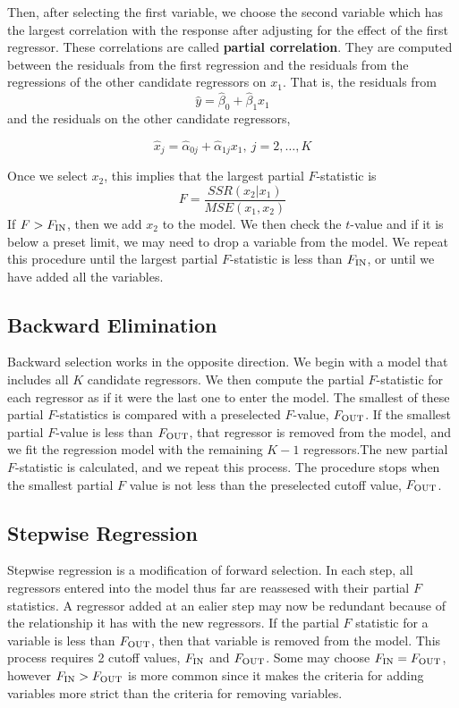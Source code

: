 Then, after selecting the first variable, we choose the second variable which has the largest correlation with the response after adjusting for the effect of the first regressor. These correlations are called \textbf{partial correlation}. They are computed between the residuals from the first regression and the residuals from the regressions of the other candidate regressors on $x_1$. That is, the residuals from 
\[\hat{y} = \hat{\beta}_0 + \hat{\beta}_1x_1 \]
and the residuals on the other candidate regressors, 

\[\hat{x}_j = \hat{\alpha}_{0j} + \hat{\alpha}_{1j}x_1, \ j = 2, \ldots, K\]

Once we select $x_2$, this implies that the largest partial $F$-statistic is 
\[F = \frac{SSR(x_2 | x_1)}{MSE(x_1,x_2)}\]
If $F > F_{\operatorname{IN}}$, then we add $x_2$ to the model. We then check the $t$-value and if it is below a preset limit, we may need to drop a variable from the model. We repeat this procedure until the largest partial $F$-statistic is less than $F_{\operatorname{IN}}$, or until we have added all the variables.

\subsection{Backward Elimination}

Backward selection works in the opposite direction. We begin with a model that includes all $K$ candidate regressors. We then compute the partial $F$-statistic for each regressor as if it were the last one to enter the model. The smallest of these partial $F$-statistics is compared with a preselected $F$-value, $F_{\operatorname{OUT}}$. If the smallest partial $F$-value is less than $F_{\operatorname{OUT}}$, that regressor is removed from the model, and we fit the regression model with the remaining $K-1$ regressors.The new partial $F$-statistic is calculated, and we repeat this process. The procedure stops when the smallest partial $F$ value is not less than the preselected cutoff value, $F_{\operatorname{OUT}}$.\\

\subsection{Stepwise Regression}

Stepwise regression is a modification of forward selection. In each step, all regressors entered into the model thus far are reassesed with their partial $F$ statistics. A regressor added at an ealier step may now be redundant because of the relationship it has with the new regressors. If the partial $F$ statistic for a variable is less than $F_{\operatorname{OUT}}$, then that variable is removed from the model. This process requires 2 cutoff values, $F_{\operatorname{IN}}$ and $F_{\operatorname{OUT}}$. Some may choose $F_{\operatorname{IN}} = F_{\operatorname{OUT}}$, however $F_{\operatorname{IN}} > F_{\operatorname{OUT}}$ is more common since it makes the criteria for adding variables more strict than the criteria for removing variables.

